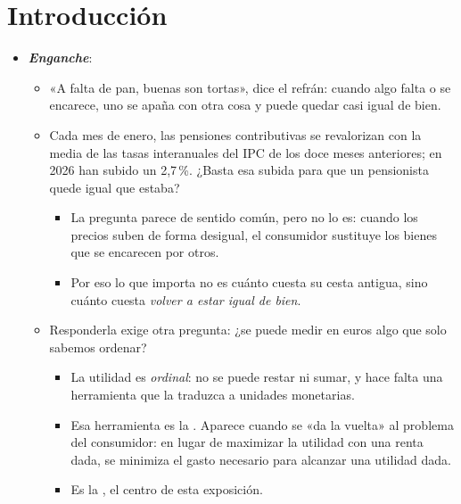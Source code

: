 \documentclass[11pt]{article}
\begin{document}
\tceetitulo

\section*{Introducción}

\begin{itemize}
\item \textbf{\emph{Enganche}}:
  \begin{itemize}
  \item «A falta de pan, buenas son tortas», dice el refrán: cuando algo falta o se encarece, uno se apaña con otra cosa y puede quedar casi igual de bien.
  \item Cada mes de enero, las pensiones contributivas se revalorizan con la media de las tasas interanuales del IPC de los doce meses anteriores; en 2026 han subido un 2,7\,\%\nocite{BOE2015LGSS,Moncloa2025Pensiones}. ¿Basta esa subida para que un pensionista quede igual que estaba?
    \begin{itemize}
    \item La pregunta parece de sentido común, pero no lo es: cuando los precios suben de forma desigual, el consumidor sustituye los bienes que se encarecen por otros.
    \item Por eso lo que importa no es cuánto cuesta su cesta antigua, sino cuánto cuesta \emph{volver a estar igual de bien}.
    \end{itemize}
  \item Responderla exige otra pregunta: ¿se puede medir en euros algo que solo sabemos ordenar?
    \begin{itemize}
    \item La utilidad es \emph{ordinal}: no se puede restar ni sumar, y hace falta una herramienta que la traduzca a unidades monetarias.
    \item Esa herramienta es la . Aparece cuando se «da la vuelta» al problema del consumidor: en lugar de maximizar la utilidad con una renta dada, se minimiza el gasto necesario para alcanzar una utilidad dada.
    \item Es la , el centro de esta exposición.
    \end{itemize}
  \end{itemize}


\end{itemize}
\end{document}
